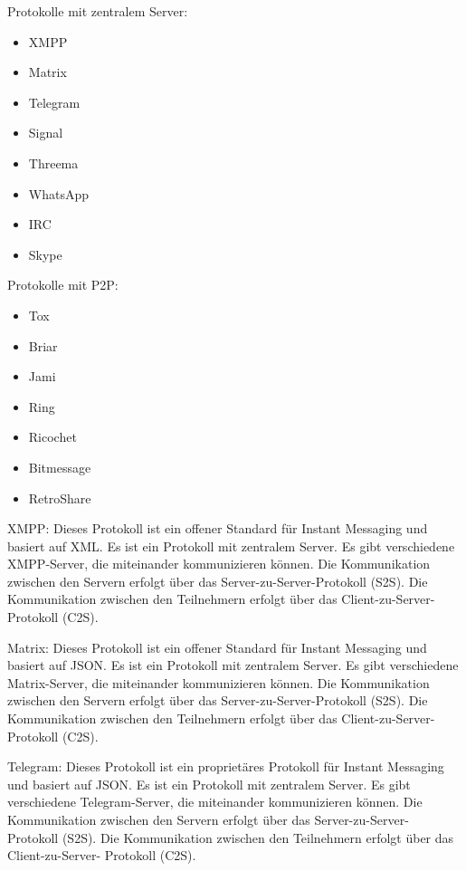 Protokolle mit zentralem Server:

\begin{itemize}
    \item XMPP
    \item Matrix
    \item Telegram
    \item Signal
    \item Threema
    \item WhatsApp
    \item IRC
    \item Skype
\end{itemize}

Protokolle mit P2P:

\begin{itemize}
    \item Tox
    \item Briar
    \item Jami
    \item Ring
    \item Ricochet
    \item Bitmessage
    \item RetroShare
\end{itemize}

XMPP:
Dieses Protokoll ist ein offener Standard für Instant Messaging und basiert auf XML. Es ist ein
Protokoll mit zentralem Server. Es gibt verschiedene XMPP-Server, die miteinander kommunizieren
können. Die Kommunikation zwischen den Servern erfolgt über das Server-zu-Server-Protokoll (S2S).
Die Kommunikation zwischen den Teilnehmern erfolgt über das Client-zu-Server-Protokoll (C2S).

Matrix:
Dieses Protokoll ist ein offener Standard für Instant Messaging und basiert auf JSON. Es ist ein
Protokoll mit zentralem Server. Es gibt verschiedene Matrix-Server, die miteinander kommunizieren
können. Die Kommunikation zwischen den Servern erfolgt über das Server-zu-Server-Protokoll (S2S).
Die Kommunikation zwischen den Teilnehmern erfolgt über das Client-zu-Server-Protokoll (C2S).

Telegram:
Dieses Protokoll ist ein proprietäres Protokoll für Instant Messaging und basiert auf JSON. Es ist
ein Protokoll mit zentralem Server. Es gibt verschiedene Telegram-Server, die miteinander
kommunizieren können. Die Kommunikation zwischen den Servern erfolgt über das Server-zu-Server-
Protokoll (S2S). Die Kommunikation zwischen den Teilnehmern erfolgt über das Client-zu-Server-
Protokoll (C2S).


